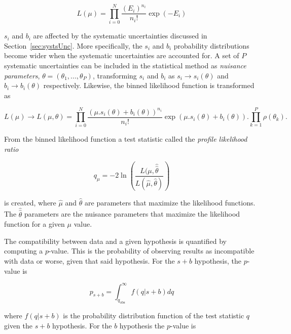 \begin{equation}
L(\mu) = \prod_{i=0}^N \frac{(E_i)^{n_i}}{n_i!}\exp (-E_i)
\end{equation}

\par $s_i$ and $b_i$ are affected by the systematic uncertainties discussed in Section~\ref{sec:systsUnc}. 
More specifically, the $s_i$ and $b_i$ probability distributions become wider when the systematic uncertainties 
are accounted for. A set of $P$ systematic uncertainties can be included in the statistical 
method as {\it nuisance parameters}, $\theta = (\theta_1,...,\theta_P)$, transforming $s_i$ and $b_i$ 
as $s_i\to s_i(\theta)$ and $b_i\to b_i(\theta)$ respectively.   
Likewise, the binned likelihood function is transformed as  

\begin{equation}
L(\mu) \to L(\mu,\theta) = \prod_{i=0}^N \frac{(\mu.s_i(\theta) + b_i(\theta))^{n_i}}{n_i!}\exp(\mu.s_i(\theta) + b_i(\theta)).\prod_{k=1}^P\rho(\theta_k).
\end{equation}

\par From the binned likelihood function a test statistic called the {\it profile likelihood ratio}

\begin{equation}
q_\mu = -2\ln\left (\frac{L(\mu,\hat{\hat{\theta}}}{L(\hat{\mu},\hat{\theta})} \right )
\label{eq:testStat}
\end{equation}

is created, where $\hat{\mu}$ and $\hat{\theta}$ are parameters that maximize the likelihood functions. 
The $\hat{\hat{\theta}}$ parameters are the nuisance parameters that maximize the likelihood function for a given $\mu$ value. 
 
\par The compatibility between data and a given hypothesis is quantified by computing a $p$-value. 
This is the probability of observing results as incompatible with data or worse, given that said hypothesis. 
For the $s+b$ hypothesis, the $p$-value is 
 
\begin{equation}
p_{s+b} = \int_{q_{\text{obs}}}^{\infty} f(q|s+b)dq
\label{eq:sPb}
\end{equation}

where $f(q|s+b)$ is the probability distribution function of the test statistic $q$ given the $s+b$ 
hypothesis. For the $b$ hypothesis the $p$-value is 

